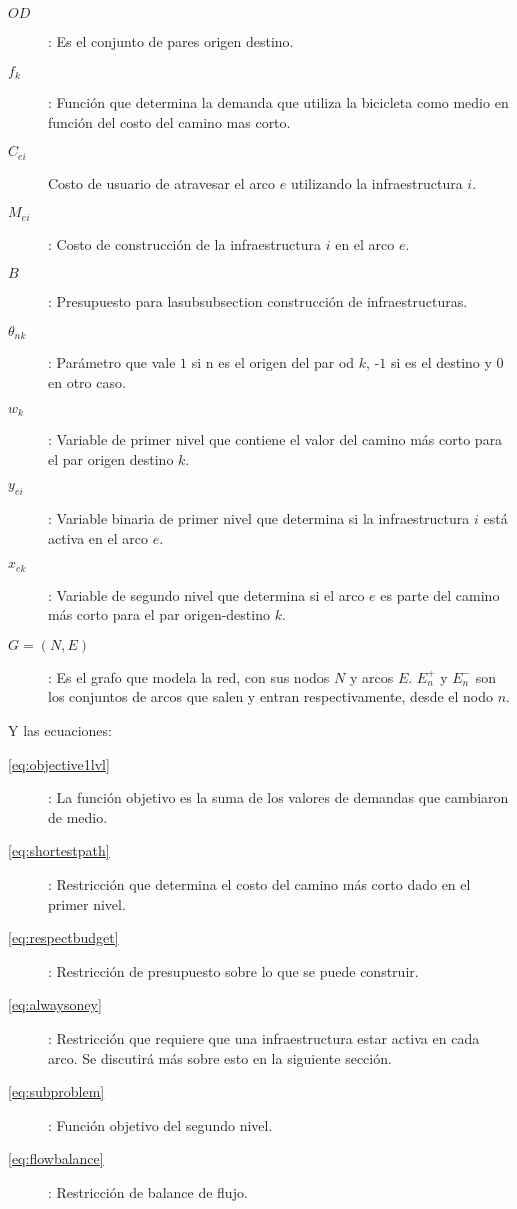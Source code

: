 \documentclass{article}
\begin{document}
  \begin{description}
    \item[$OD$]: Es el conjunto de pares origen destino.
    \item[$f_k$]: Función que determina la demanda que utiliza la bicicleta como medio en función del costo del camino mas corto.
    \item[$C_{ei}$] Costo de usuario de atravesar el arco $e$ utilizando la infraestructura $i$.
    \item[$M_{ei}$]: Costo de construcción de la infraestructura $i$ en el arco $e$.
    \item[$B$]: Presupuesto para lasubsubsection construcción de infraestructuras.
    \item[$\theta_{nk}$]: Parámetro que vale $1$ si n es el origen del par od $k$, -$1$ si es el destino y $0$ en otro caso.
    \item[$w_k$]: Variable de primer nivel que contiene el valor del camino más corto para el par origen destino $k$.
    \item[$y_{ei}$]: Variable binaria de primer nivel que determina si la infraestructura $i$ está activa en el arco $e$.
    \item[$x_{ek}$]: Variable de segundo nivel que determina si el arco $e$ es parte del camino más corto para el par origen-destino $k$.
    \item[$G=(N,E)$]: Es el grafo que modela la red, con sus nodos $N$ y arcos $E$. $E_n^+$ y $E_n^-$ son los conjuntos de arcos que salen y entran respectivamente, desde el nodo $n$.
  \end{description}

  Y las ecuaciones:

  \begin{description}
    \item[\ref{eq:objective1lvl}]: La función objetivo es la suma de los valores de demandas que cambiaron de medio.
    \item[\ref{eq:shortestpath}]: Restricción que determina el costo del camino más corto dado en el primer nivel.
    \item[\ref{eq:respectbudget}]: Restricción de presupuesto sobre lo que se puede construir.
    \item[\ref{eq:alwaysoney}]: Restricción que requiere que una infraestructura estar activa en cada arco. Se discutirá más sobre esto en la siguiente sección.
    \item[\ref{eq:subproblem}]: Función objetivo del segundo nivel.
    \item[\ref{eq:flowbalance}]: Restricción de balance de flujo.
  \end{description}
\end{document}
